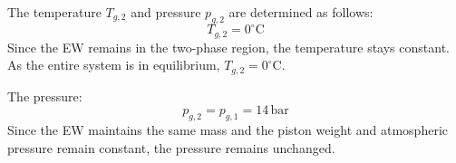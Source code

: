 The temperature \( T_{g,2} \) and pressure \( p_{g,2} \) are determined as follows:  
\[ T_{g,2} = 0^\circ \text{C} \]  
Since the EW remains in the two-phase region, the temperature stays constant. As the entire system is in equilibrium, \( T_{g,2} = 0^\circ \text{C} \).  

The pressure:  
\[ p_{g,2} = p_{g,1} = 14 \, \text{bar} \]  
Since the EW maintains the same mass and the piston weight and atmospheric pressure remain constant, the pressure remains unchanged.